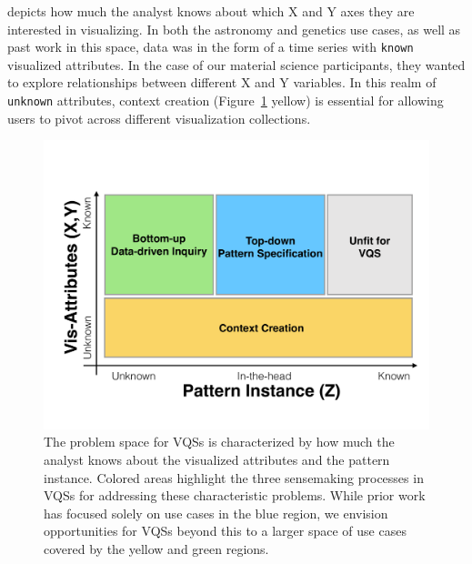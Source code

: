 depicts how much the analyst
knows about which X and Y axes
they are interested in visualizing.
In both the astronomy and genetics use cases,
as well as past work in this space,
data was in the form of a time series
with \texttt{known} visualized attributes.
In the case of our material science participants,
they wanted to explore relationships between different
X and Y variables.
In this realm of \texttt{unknown} attributes,
context creation (Figure~\ref{2dmodel} yellow) is
essential for allowing users
to pivot across different visualization collections.%
\begin{figure}[h!]
  \centering
  \includegraphics[width=0.9\linewidth]{figures/2dmodel.pdf}
  \caption{The problem space for VQSs is characterized by how much the analyst knows about the visualized attributes and the pattern instance. Colored areas highlight the three sensemaking processes in VQSs for addressing these characteristic problems. While prior work has focused solely on use cases in the blue region, we envision opportunities for VQSs beyond this to a larger space of use cases covered by the yellow and green regions.}
  \label{2dmodel}
  \vspace{-10pt}
\end{figure}
